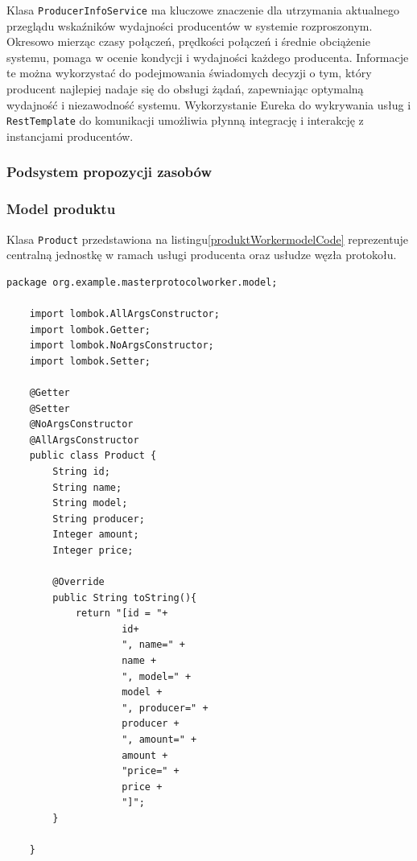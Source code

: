 Klasa \verb|ProducerInfoService| ma kluczowe znaczenie dla utrzymania aktualnego przeglądu wskaźników wydajności producentów w systemie rozproszonym. Okresowo mierząc czasy połączeń, prędkości połączeń i średnie obciążenie systemu, pomaga w ocenie kondycji i wydajności każdego producenta. Informacje te można wykorzystać do podejmowania świadomych decyzji o tym, który producent najlepiej nadaje się do obsługi żądań, zapewniając optymalną wydajność i niezawodność systemu. Wykorzystanie Eureka do wykrywania usług i \verb|RestTemplate| do komunikacji  umożliwia płynną integrację i interakcję z instancjami producentów.

\subsubsection{Podsystem propozycji zasobów}

\subsubsection{Model produktu}

Klasa \verb|Product| przedstawiona na listingu\ref{produktWorkermodelCode} reprezentuje centralną jednostkę w ramach usługi producenta oraz usłudze węzła protokołu.

\begin{lstlisting}[caption=Klasa reprezentująca produkt, label=produktWorkermodelCode]
    package org.example.masterprotocolworker.model;
    
    import lombok.AllArgsConstructor;
    import lombok.Getter;
    import lombok.NoArgsConstructor;
    import lombok.Setter;
    
    @Getter
    @Setter
    @NoArgsConstructor
    @AllArgsConstructor
    public class Product {
        String id;
        String name;
        String model;
        String producer;
        Integer amount;
        Integer price;
    
        @Override
        public String toString(){
            return "[id = "+
                    id+
                    ", name=" +
                    name +
                    ", model=" +
                    model +
                    ", producer=" +
                    producer +
                    ", amount=" +
                    amount +
                    "price=" +
                    price +
                    "]";
        }
    
    }
\end{lstlisting}

